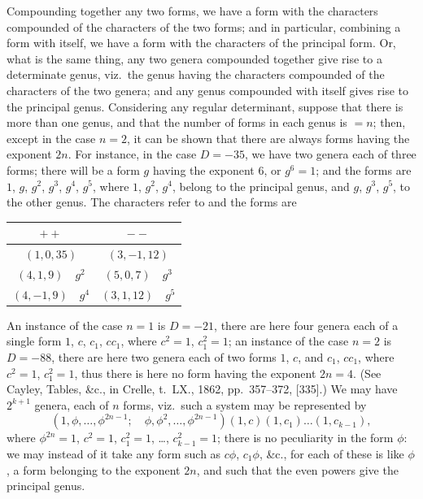 \documentclass[11pt,a4paper]{article}
\begin{document}
Compounding together any two forms, we have a form with the characters compounded of the characters of the two forms; and in particular, combining a form with itself, we have a form with the characters of the principal form. Or, what is the same thing, any two genera compounded together give rise to a determinate genus, viz.\ the genus having the characters compounded of the characters of the two genera; and any genus compounded with itself gives rise to the principal genus. Considering any regular determinant, suppose that there is more than one genus, and that the number of forms in each genus is $= n$; then, except in the case $n = 2$, it can be shown that there are always forms having the exponent $2n$. For instance, in the case $D = -35$, we have two genera each of three forms; there will be a form $g$ having the exponent 6, or $g^{6} = 1$; and the forms are $1$, $g$, $g^{2}$, $g^{3}$, $g^{4}$, $g^{5}$, where $1$, $g^{2}$, $g^{4}$, belong to the principal genus, and $g$, $g^{3}$, $g^{5}$, to the other genus. The characters refer to and the forms are
\begin{center}
\begin{tabular}{c|c}
$++$ & $--$ \\ \hline
$(1, 0, 35)$ & $(3, -1, 12)$ \\
$(4, 1, 9) \quad g^{2}$ & $(5, 0, 7) \quad g^{3}$ \\
$(4, -1, 9) \quad g^{4}$ & $(3, 1, 12) \quad g^{5}$
\end{tabular}
\end{center}
An instance of the case $n = 1$ is $D = -21$, there are here four genera each of a single form $1$, $c$, $c_{1}$, $cc_{1}$, where $c^{2} = 1$, $c_{1}^{2} = 1$; an instance of the case $n = 2$ is $D = -88$, there are here two genera each of two forms $1$, $c$, and $c_{1}$, $cc_{1}$, where $c^{2} = 1$, $c_{1}^{2} = 1$, thus there is here no form having the exponent $2n = 4$. (See Cayley, Tables, \&c., in Crelle, t.\ LX., 1862, pp.~357--372, [335].) We may have $2^{k+1}$ genera, each of $n$ forms, viz.\ such a system may be represented by
\[
(1, \phi, \ldots, \phi^{2n-1}; \quad \phi, \phi^{2}, \ldots, \phi^{2n-1})(1, c)(1, c_{1}) \ldots (1, c_{k-1}),
\]
where $\phi^{2n} = 1$, $c^{2} = 1$, $c_{1}^{2} = 1$, \ldots, $c_{k-1}^{2} = 1$; there is no peculiarity in the form $\phi$: we may instead of it take any form such as $c\phi$, $c_{1}\phi$, \&c., for each of these is like $\phi$, a form belonging to the exponent $2n$, and such that the even powers give the principal genus.
\end{document}
